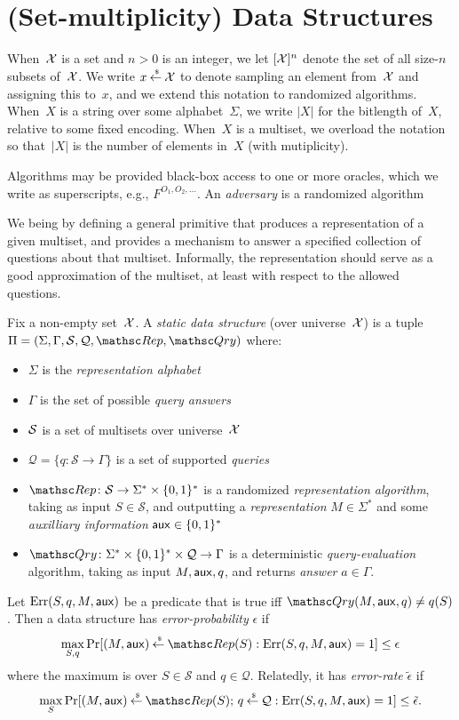 \section{(Set-multiplicity) Data Structures}
\def\pub{{\sf pub}}
\def\aux{{\sf aux}}

When~${\cal X}$ is a set and $n>0$ is an integer, we let $[{\cal X}]^n$ denote the set of all size-$n$ subsets of~${\cal X}$. We write $x {\:\stackrel{{\scriptscriptstyle \hspace{0.2em}\$}} {\leftarrow}\:} {\cal X}$ to denote sampling an element from~${\cal X}$ and assigning this to~$x$, and we extend this notation to randomized algorithms.  When~$X$ is a string over some alphabet~$\Sigma$, we write $|X|$ for the bitlength of~$X$, relative to some fixed encoding.  When~$X$ is a multiset, we overload the notation so that~$|X|$ is the number of elements in~$X$ (with mutiplicity).

Algorithms may be provided black-box access to one or more oracles, which we write as superscripts, e.g., $F^{O_1,O_2,\ldots}$.  An \emph{adversary} is a randomized algorithm

  We being by defining a general primitive that produces a representation of a given multiset, and provides a mechanism to answer a specified collection of questions about that multiset.  Informally, the representation should serve as a good approximation of the multiset, at least with respect to the allowed questions.
\begin{definition} \rm
Fix a non-empty set~${\cal X}$. A \emph{static data structure} (over universe~${\cal X}$)
is a tuple $\setprim=(\Sigma,\Gamma,\calS,\calQ,\Rep, \Qry)$ where:
\begin{itemize}
\item $\Sigma$ is the \emph{representation alphabet}
\item $\Gamma$ is the set of possible \emph{query answers}
\item ${\cal S}$ is a set  of multisets over universe~${\cal X}$
\item $\mathcal{Q}=\{q \colon \mathcal{S} \to \Gamma\}$ is a set of supported \emph{queries}
\item $\Rep \colon \mathcal{S} \to \Sigma^* \times \bits^*$ is a randomized \emph{representation algorithm}, taking as input $S \in \mathcal{S}$, and outputting a \emph{representation} $M \in \Sigma^*$ and some \emph{auxilliary information} $\aux \in \bits^*$
\item $\Qry\colon \Sigma^* \times \bits^* \times \calQ \to \Gamma$ is a deterministic \emph{query-evaluation} algorithm, taking as input $M, \aux, q$, and returns \emph{answer} $a \in \Gamma$.
\end{itemize}
Let $\mathrm{Err}(S,q,M,\aux)$ be a predicate that is true iff $\Qry(M, \aux, q) \neq q(S)$.  Then a data structure
has \emph{error-probability} $\epsilon$ if
\[
\max_{S,q}\Pr[(M,\aux) \getsr \Rep(S) : \mathrm{Err}(S,q,M,\aux)=1 ] \leq \epsilon
\]
where the maximum is over $S \in \mathcal{S}$ and $q \in \mathcal{Q}$.  Relatedly, it has \emph{error-rate} $\tilde{\epsilon}$ if
\[
\max_{S}\Pr[(M,\aux) \getsr \Rep(S);\, q \getsr \calQ : \mathrm{Err}(S,q,M,\aux)=1] \leq \tilde{\epsilon}.
\]
\end{definition}

